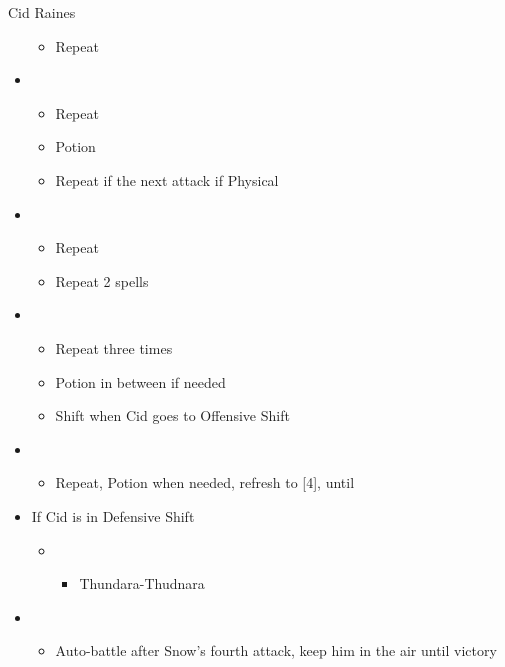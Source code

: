 \begin{paracol}{2}
\begin{battle}{Cid Raines}
\begin{itemize}
\begin{itemize}
				      \item Repeat
			      \end{itemize}
			\item \fourth
			      \begin{itemize}
				      \item Repeat
				      \item Potion
				      \item Repeat if the next attack if Physical
			      \end{itemize}
			\item \fifth
			      \begin{itemize}
				      \item Repeat
				      \item Repeat 2 spells
			      \end{itemize}
			\item \second
			      \begin{itemize}
				      \item Repeat three times
				      \item Potion in between if needed
				      \item Shift when Cid goes to Offensive Shift
			      \end{itemize}
			\item \third
			      \begin{itemize}
				      \item Repeat, Potion when needed, refresh to [4], until \stagger
			      \end{itemize}
			\item If Cid is in Defensive Shift
			      \begin{itemize}
				      \item \second
				            \begin{itemize}
					            \item Thundara-Thudnara
				            \end{itemize}
			      \end{itemize}
			\item \sixth
			      \begin{itemize}
				      \item Auto-battle after Snow's fourth attack, keep him in the air until victory
			      \end{itemize}
		\end{itemize}
	\end{battle}
	\switchcolumn*
	\begin{menu}
		\begin{itemize}

\end{itemize}
\end{menu}
\end{paracol}
